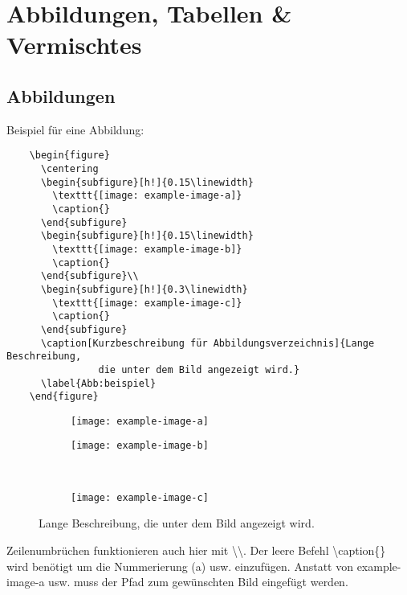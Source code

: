 \chapter{Abbildungen, Tabellen \& Vermischtes}

\section{Abbildungen}
Beispiel für eine Abbildung:
\begin{verbatim}
	\begin{figure}
  	  \centering
  	  \begin{subfigure}[h!]{0.15\linewidth}
    	\texttt{[image: example-image-a]}
    	\caption{}
  	  \end{subfigure}
  	  \begin{subfigure}[h!]{0.15\linewidth}
    	\texttt{[image: example-image-b]}
    	\caption{}
  	  \end{subfigure}\\
  	  \begin{subfigure}[h!]{0.3\linewidth}
    	\texttt{[image: example-image-c]}
    	\caption{}
  	  \end{subfigure}
  	  \caption[Kurzbeschreibung für Abbildungsverzeichnis]{Lange Beschreibung,
  	  			die unter dem Bild angezeigt wird.}
  	  \label{Abb:beispiel}
	\end{figure}
\end{verbatim}

\begin{figure}
  \centering
  \begin{subfigure}[h!]{0.25\linewidth}
    \texttt{[image: example-image-a]}
    \caption{}
  \end{subfigure}
  \begin{subfigure}[h!]{0.25\linewidth}
    \texttt{[image: example-image-b]}
    \caption{}
  \end{subfigure}\\
  \begin{subfigure}[h!]{0.5\linewidth}
    \texttt{[image: example-image-c]}
    \caption{}
  \end{subfigure}
  \caption[Kurzbeschreibung für Abbildungsverzeichnis]{Lange Beschreibung, die unter dem Bild angezeigt wird.}
  \label{Abb:beispiel}
\end{figure}

Zeilenumbrüchen funktionieren auch hier mit \textbackslash \textbackslash . Der leere Befehl \textbackslash caption\{\} wird benötigt um die Nummerierung \glqq{}(a)\grqq{} usw. einzufügen. Anstatt von \glqq{}example-image-a\grqq{} usw. muss der Pfad zum gewünschten Bild eingefügt werden.

